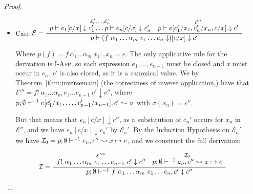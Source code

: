 \begin{proof}
\begin{itemize}
\begin{itemize}
         An analogous proof works for when $e = \lett{(x, y)}{e_1}{e_2}$.

     \end{itemize}

    \item Case $\mathcal{E} =
      \dfrac
        {\begin{array}{cc}
            \overset
              {\mathcal{E}'_0, \dots, \mathcal{E}'_n}
              {p \vdash e_1 [c / x] \downarrow c_1' \dots p \vdash e_n [c / x] \downarrow c_n'} &
            \overset
              {\mathcal{E}''}
              {p \vdash e[c_1' / x_1, c_n' / x_n, c / x] \downarrow c'}
         \end{array}
        }
        {p \vdash (f~\alpha_1 \dots \alpha_m~e_1 \dots e_n \downarrow) [c / x] \downarrow c'}$

        Where $p(f) = f~\alpha_1 \dots \alpha_m~x_1 \dots x_n = e$. The only
        applicative rule for the derivation is \textsc{I-App}, so each
        expression $e_1, \dots, e_{n-1}$ must be closed and $x$ must occur in
        $e_n$. $c'$ is also closed, as it is a canonical value. We by
        Theorem~\ref{thm:inversemain} (the correctness of inverse application,)
        have that $\mathcal{E}''' = f!~\alpha_1 \dots \alpha_m~e_1 \dots
        e_{n-1}~c' \downarrow c''$, where $p;\emptyset\vdash^{-1} e[c_1' / x_1, \dots,
        c_{n-1}' / x_{n-1}], c' \leadsto \sigma$ with $\sigma(x_n) = c''$.

        But that means that $e_n [c / x] \downarrow c''$, as a substitution of
        $c_n'$ occurs for $x_n $ in $\mathcal{E}''$, and we have $e_n [c / x]
        \downarrow c_n'$ by $\mathcal{E}_n'$. By the Induction Hypothesis on
        $\mathcal{E}_n'$ we have $\mathcal{I}_0 = p;\emptyset\vdash^{-1} e_n, c'' \leadsto x
        \mapsto c$, and we construct the full derivation:

        \begin{align*}
          \mathcal{I} = \dfrac
            {\begin{array}{cc}
                \overset
                  {\mathcal{E}''''}
                  {f!~\alpha_1 \dots \alpha_m~e_1 \dots e_{n-1}~c' \downarrow c''} &
                \overset
                  {\mathcal{I}_0}
                  {p;\emptyset\vdash^{-1} e_n, c'' \leadsto x \mapsto c}
             \end{array}
            }
            {p;\emptyset\vdash^{-1} f~\alpha_1 \dots \alpha_m~e_1 \dots e_n, c' \downarrow c''}
        \end{align*}


\end{itemize}
\end{proof}
